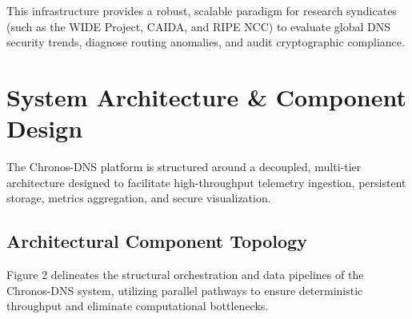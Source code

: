 \documentclass[10pt,journal,compsoc]{IEEEtran}
\begin{document}
This infrastructure provides a robust, scalable paradigm for research syndicates (such as the WIDE Project, CAIDA, and RIPE NCC) to evaluate global DNS security trends, diagnose routing anomalies, and audit cryptographic compliance.

\section{System Architecture \& Component Design}
The Chronos-DNS platform is structured around a decoupled, multi-tier architecture designed to facilitate high-throughput telemetry ingestion, persistent storage, metrics aggregation, and secure visualization.

\subsection{Architectural Component Topology}
Figure 2 delineates the structural orchestration and data pipelines of the Chronos-DNS system, utilizing parallel pathways to ensure deterministic throughput and eliminate computational bottlenecks.
\end{document}
